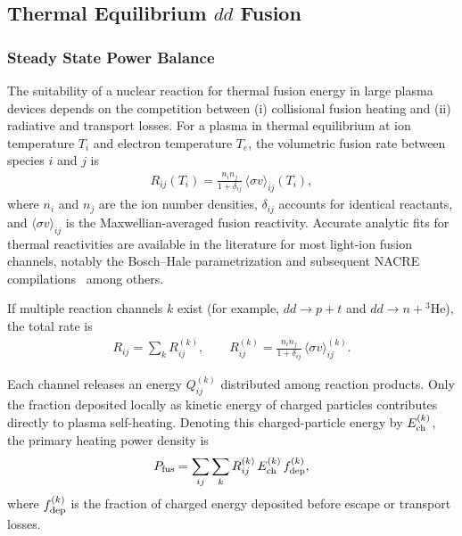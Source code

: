 \documentclass[particles,article,accept,pdftex,moreauthors]{Definitions/mdpi}
\begin{document}
\subsection{Thermal Equilibrium \texorpdfstring{$dd$}{dd} Fusion}\label{ssec:ThermalBalance}
\subsubsection{Steady State Power Balance}\label{sssec:PowerBalance}
The suitability of a nuclear reaction for thermal fusion energy in large plasma devices depends on the competition between (i) collisional fusion heating and (ii) radiative and transport losses. For a plasma in thermal equilibrium at ion temperature $T_i$ and electron temperature $T_e$, the volumetric fusion rate between species $i$ and $j$ is
\begin{align}
R_{ij}(T_i)
= \frac{n_i n_j}{1+\delta_{ij}}
\,\langle \sigma v\rangle_{ij}(T_i),
\end{align}
where $n_i$ and $n_j$ are the ion number densities, $\delta_{ij}$ accounts for identical reactants, and $\langle \sigma v\rangle_{ij}$ is the Maxwellian-averaged fusion reactivity. Accurate analytic fits for thermal reactivities are available in the literature for most light-ion fusion channels, notably the Bosch--Hale parametrization and subsequent NACRE compilations~\cite{bosch1992improved,Angulo:1999zz,Xu:2013fha} among others.

If multiple reaction channels $k$ exist (for example, $dd\to p+t$ and $dd\to n+{}^3$He), the total rate is
\begin{align}
R_{ij}
= \sum_k R_{ij}^{(k)}, 
\qquad
R_{ij}^{(k)}
= \frac{n_i n_j}{1+\delta_{ij}}
\,\langle \sigma v\rangle_{ij}^{(k)} .
\end{align}

Each channel releases an energy $Q_{ij}^{(k)}$ distributed among reaction products. Only the fraction deposited locally as kinetic energy of charged particles contributes directly to plasma self-heating. Denoting this charged-particle energy by $E_{\rm ch}^{(k)}$, the primary heating power density is
\begin{align}
P_{\rm fus}
= \sum_{ij}\sum_k 
R_{ij}^{(k)}\,E_{\rm ch}^{(k)}\,f_{\rm dep}^{(k)},
\label{eq:powerFusion}
\end{align}
where $f_{\rm dep}^{(k)}$ is the fraction of charged energy deposited before escape or transport losses. 
\end{document}
